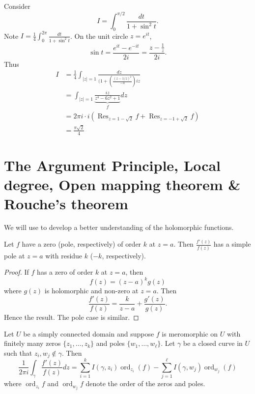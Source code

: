 \documentclass[a4paper]{article}
\DeclareMathOperator*{\res}{Res}
\DeclareMathOperator*{\ord}{ord}
\begin{document}
\begin{eg}
  Consider
  \[
    I = \int_0^{\pi/2} \frac{dt}{1 + \sin^2 t}.
  \]
  Note \(I = \frac{1}{4} \int_0^{2\pi} \frac{dt}{1 + \sin^2 t}\). On the unit circle \(z = e^{it}\),
  \[
    \sin t = \frac{e^{it} - e^{-it}}{2i} = \frac{z - \frac{1}{z}}{2i}.
  \]
  Thus
  \begin{align*}
    I
    &= \frac{1}{4} \int_{|z| = 1} \frac{dz}{(1 + (\frac{(z - 1/z)^2}{-4})iz} \\
    &= \int_{|z| = 1} \underbrace{\frac{iz}{z^4 - 6z^2 + 1}}_f dz \\
    &= 2\pi i \cdot i (\res_{z = 1 - \sqrt 2} f + \res_{z = -1 + \sqrt 2} f) \\
    &= \frac{\pi\sqrt 2}{4}
  \end{align*}
\end{eg}

\section{The Argument Principle, Local degree, Open mapping theorem \& Rouche's theorem}

We will use  to develop a better understanding of the holomorphic functions.

\begin{proposition}
  Let \(f\) have a zero (pole, respectively) of order \(k\) at \(z = a\). Then \(\frac{f'(z)}{f(z)}\) has a simple pole at \(z = a\) with residue \(k\) (\(-k\), respectively).
\end{proposition}

\begin{proof}
  If \(f\) has a zero of order \(k\) at \(z = a\), then
  \[
    f(z) = (z - a)^k g(z)
  \]
  where \(g(z)\) is holomorphic and non-zero at \(z = a\). Then
  \[
    \frac{f'(z)}{f(z)} = \frac{k}{z - a} + \frac{g'(z)}{g(z)}.
  \]
  Hence the result. The pole case is similar.
\end{proof}

\begin{theorem}
  \label{thm:argument principle}
  Let \(U\) be a simply connected domain and suppose \(f\) is meromorphic on \(U\) with finitely many zeros \(\{z_1, \dots, z_k\}\) and poles \(\{w_1, \dots, w_\ell\}\). Let \(\gamma\) be a closed curve in \(U\) such that \(z_i, w_j \notin \gamma\). Then
  \[
    \frac{1}{2\pi i} \int_\gamma \frac{f'(z)}{f(z)} dz
    = \sum_{i = 1}^k I(\gamma, z_i) \ord_{z_i}(f)
    - \sum_{j = 1}^\ell I(\gamma, w_j) \ord_{w_j}(f)
  \]
  where \(\ord_{z_i} f\) and \(\ord_{w_j} f\) denote the order of the zeros and poles.
\end{theorem}
\end{document}
